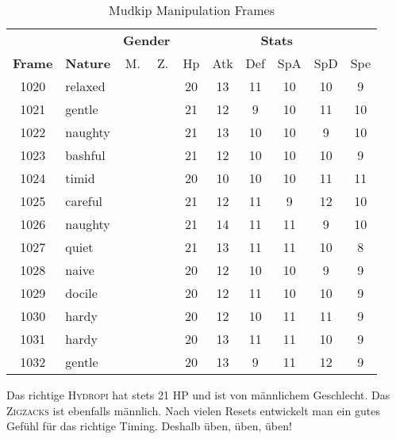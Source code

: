 \documentclass[11pt,a4paper,titlepage]{article}
\begin{document}
{{{{
\begin{table}[htb]
	\caption{Mudkip Manipulation Frames}
	\label{tab:mudkip_frames}
	\centering
	\begin{tabular}{clcccccccc}
		\toprule
		& & \multicolumn{2}{c}{\textbf{Gender}}	& \multicolumn{6}{c}{\textbf{Stats}}					\\
		\cmidrule(rl){3-4}\cmidrule(ll){5-10}
	\textbf{Frame} 	&\textbf{Nature}		&M. 		&Z.	&Hp		&Atk 	&Def 	&SpA		&SpD		&Spe		\\
		\midrule
			1020 	&relaxed		&\female	&\female 	&20		&13		&11		&10		&10		&9		\\
			1021 	&gentle		&\male 	&\male 		&21		&12		&9		&10		&11		&10		\\
			1022 	&naughty		&\male	&\male		&21 		&13		&10		&10		&9		&10		\\
			1023 	&bashful	 	&\female	&\male	  	&21		&12		&10		&10		&10		&9		\\
			1024 	&timid		&\male	&\male		&20		&10		&10		&10		&11		&11		\\
			1025 	&careful		&\male 	&\male 		&21		&12		&11		&9		&12		&10		\\
		\rowcolor{Gray}
			1026 	&naughty		&\male 	&\male 		&21		&14		&11		&11		&9		&10		\\
			1027 	&quiet		&\male 	&\female 	&21		&13		&11		&11		&10		&8		\\
			1028 	&naive		&\male	&\female		&20		&12		&10		&10		&9		&9		\\
			1029 	&docile		&\male	&\male		&20		&12		&11		&10		&10		&9		\\
			1030 	&hardy		&\male 	&\male 		&20		&12		&10		&11		&11		&9		\\
			1031 	&hardy		&\male 	&\male 		&20		&13		&11		&11		&10		&9		\\
			1032 	&gentle		&\male 	&\female 	&20		&13		&9		&11		&12		&9		\\
		\bottomrule
	\end{tabular}
\end{table}

Das richtige \textsc{Hydropi} hat stets 21 HP und ist von männlichem Geschlecht. Das \textsc{Zigzacks} ist ebenfalls männlich. Nach vielen Resets entwickelt man ein gutes Gefühl für das richtige Timing. Deshalb üben, üben, üben!

}}}}
\end{document}
